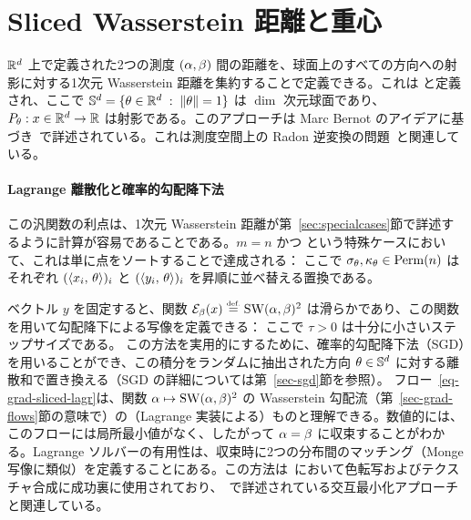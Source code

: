 \section{Sliced Wasserstein 距離と重心}\label{sec-sliced}

$\mathbb{R}^d$ 上で定義された2つの測度 $(\alpha,\beta)$ 間の距離を、球面上のすべての方向への射影に対する1次元 Wasserstein 距離を集約することで定義できる。これは
と定義され、ここで $\mathbb{S}^d = \{ \theta \in \mathbb{R}^d \;:\; \left\| \theta \right\|=1 \}$ は $\dim$ 次元球面であり、$P_\theta : x \in \mathbb{R}^d \rightarrow \mathbb{R}$ は射影である。このアプローチは Marc Bernot のアイデアに基づき~\citep{2013-Bonneel-barycenter}で詳述されている。これは測度空間上の Radon 逆変換の問題~\citep{AbrahamRadon}と関連している。

\paragraph{Lagrange 離散化と確率的勾配降下法}

この汎関数の利点は、1次元 Wasserstein 距離が第~\ref{sec:specialcases}節で詳述するように計算が容易であることである。$m=n$ かつ
という特殊ケースにおいて、これは単に点をソートすることで達成される：
ここで $\sigma_\theta,\kappa_\theta \in \mathrm{Perm}(n)$ はそれぞれ $(\langle x_i,\,\theta\rangle)_i$ と $(\langle y_i,\,\theta\rangle)_i$ を昇順に並べ替える置換である。

ベクトル $y$ を固定すると、関数 $\mathcal{E}_\beta(x) \stackrel{\mbox{\upshape\tiny def.}}{=} \operatorname{SW}(\alpha,\beta)^2$ は滑らかであり、この関数を用いて勾配降下による写像を定義できる：
ここで $\tau>0$ は十分に小さいステップサイズである。
この方法を実用的にするために、確率的勾配降下法（SGD）を用いることができ、この積分をランダムに抽出された方向 $\theta \in \mathbb{S}^d$ に対する離散和で置き換える（SGD の詳細については第~\ref{sec-sgd}節を参照）。
フロー~\eqref{eq-grad-sliced-lagr}は、関数 $\alpha \mapsto \operatorname{SW}(\alpha,\beta)^2$ の Wasserstein 勾配流（第~\ref{sec-grad-flows}節の意味で）の（Lagrange 実装による）ものと理解できる。数値的には、このフローには局所最小値がなく、したがって $\alpha=\beta$ に収束することがわかる。Lagrange ソルバーの有用性は、収束時に2つの分布間のマッチング（Monge 写像に類似）を定義することにある。この方法は~\citep{rabin-ssvm-11}において色転写およびテクスチャ合成に成功裏に使用されており、~\citep{pitie2007automated}で詳述されている交互最小化アプローチと関連している。

